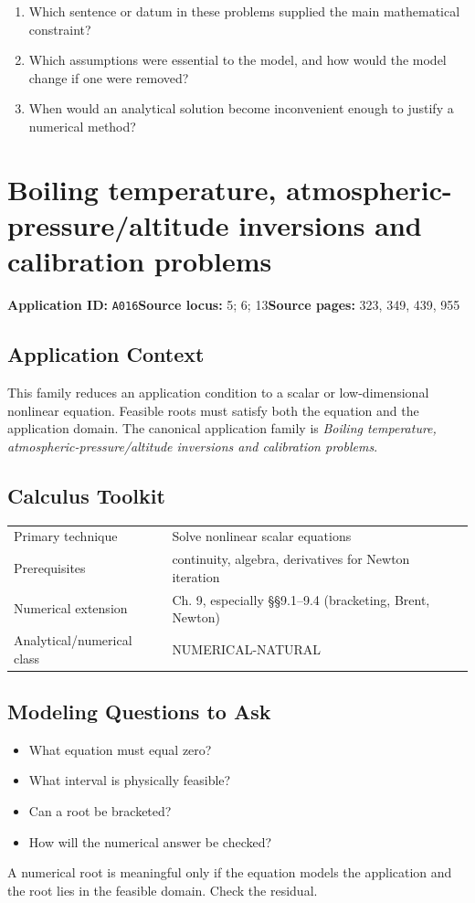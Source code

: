 \documentclass[11pt]{book}
\newcommand{\pid}[1]{\texttt{#1}}
\begin{document}
\begin{reflectionbox}\begin{enumerate}
\item Which sentence or datum in these problems supplied the main mathematical constraint?
\item Which assumptions were essential to the model, and how would the model change if one were removed?
\item When would an analytical solution become inconvenient enough to justify a numerical method?
\end{enumerate}\end{reflectionbox}
\chapter{Boiling temperature, atmospheric-pressure/altitude inversions and calibration problems}\label{app:A016}
\textbf{Application ID:} \pid{A016}\quad \textbf{Source locus:} 5; 6; 13\quad \textbf{Source pages:} 323, 349, 439, 955
\section*{Application Context}
This family reduces an application condition to a scalar or low-dimensional nonlinear equation. Feasible roots must satisfy both the equation and the application domain. The canonical application family is \emph{Boiling temperature, atmospheric-pressure/altitude inversions and calibration problems}.
\section*{Calculus Toolkit}
\begin{tabularx}{\textwidth}{@{}lX@{}}\toprule
Primary technique & Solve nonlinear scalar equations \\
Prerequisites & continuity, algebra, derivatives for Newton iteration \\
Numerical extension & Ch. 9, especially §§9.1–9.4 (bracketing, Brent, Newton) \\
Analytical/numerical class & NUMERICAL-NATURAL \\
\bottomrule\end{tabularx}
\section*{Modeling Questions to Ask}\begin{itemize}
\item What equation must equal zero?
\item What interval is physically feasible?
\item Can a root be bracketed?
\item How will the numerical answer be checked?
\end{itemize}
\begin{errorbox}A numerical root is meaningful only if the equation models the application and the root lies in the feasible domain. Check the residual.\end{errorbox}
\end{document}
